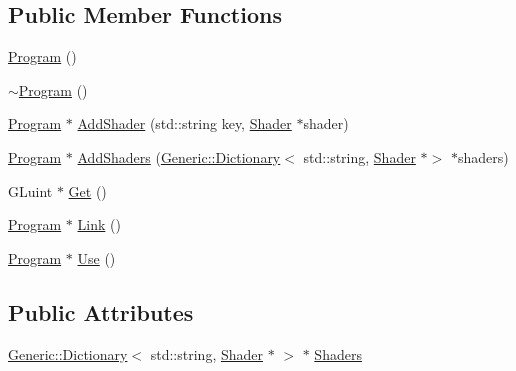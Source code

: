 \subsection*{Public Member Functions}
\begin{DoxyCompactItemize}
\item 
\mbox{\hyperlink{classEngine_1_1Components_1_1Graphics_1_1Program_ad54457a5a04a41fcfdd356a0a42427ba}{Program}} ()
\item 
\mbox{\hyperlink{classEngine_1_1Components_1_1Graphics_1_1Program_ac7c50fa362e7d460d652dac07175e750}{$\sim$\+Program}} ()
\item 
\mbox{\hyperlink{classEngine_1_1Components_1_1Graphics_1_1Program}{Program}} $\ast$ \mbox{\hyperlink{classEngine_1_1Components_1_1Graphics_1_1Program_a95af201a6fab77be50b5fdefbf3bbe63}{Add\+Shader}} (std\+::string key, \mbox{\hyperlink{classEngine_1_1Components_1_1Graphics_1_1Shader}{Shader}} $\ast$shader)
\item 
\mbox{\hyperlink{classEngine_1_1Components_1_1Graphics_1_1Program}{Program}} $\ast$ \mbox{\hyperlink{classEngine_1_1Components_1_1Graphics_1_1Program_ad0db30a829b9492418177179d4ae16e7}{Add\+Shaders}} (\mbox{\hyperlink{classGeneric_1_1Dictionary}{Generic\+::\+Dictionary}}$<$ std\+::string, \mbox{\hyperlink{classEngine_1_1Components_1_1Graphics_1_1Shader}{Shader}} $\ast$$>$ $\ast$shaders)
\item 
G\+Luint $\ast$ \mbox{\hyperlink{classEngine_1_1Components_1_1Graphics_1_1Program_a2f8a229f633939c001fcfc46f7b7fd0b}{Get}} ()
\item 
\mbox{\hyperlink{classEngine_1_1Components_1_1Graphics_1_1Program}{Program}} $\ast$ \mbox{\hyperlink{classEngine_1_1Components_1_1Graphics_1_1Program_aca3b3c45bf67386dc5fb3c25d687593a}{Link}} ()
\item 
\mbox{\hyperlink{classEngine_1_1Components_1_1Graphics_1_1Program}{Program}} $\ast$ \mbox{\hyperlink{classEngine_1_1Components_1_1Graphics_1_1Program_aed02e665619dda6c6cf80e03cb1f1543}{Use}} ()
\end{DoxyCompactItemize}
\subsection*{Public Attributes}
\begin{DoxyCompactItemize}
\item 
\mbox{\hyperlink{classGeneric_1_1Dictionary}{Generic\+::\+Dictionary}}$<$ std\+::string, \mbox{\hyperlink{classEngine_1_1Components_1_1Graphics_1_1Shader}{Shader}} $\ast$ $>$ $\ast$ \mbox{\hyperlink{classEngine_1_1Components_1_1Graphics_1_1Program_aff39fa56fc1fab1bce6c8a5ce29ae161}{Shaders}}
\end{DoxyCompactItemize}
